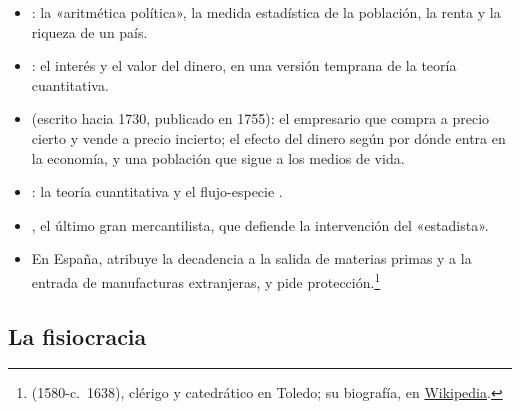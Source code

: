 \documentclass[11pt]{article}
\begin{document}
\begin{itemize}
\item {}: la «aritmética política», la medida estadística de la población, la renta y la riqueza de un país\nocite{Petty1690Political}.
\item {}: el interés y el valor del dinero, en una versión temprana de la teoría cuantitativa\nocite{Locke1692Some}.
\item {} (escrito hacia 1730, publicado en 1755): el empresario que compra a precio cierto y vende a precio incierto; el efecto del dinero según por dónde entra en la economía, y una población que sigue a los medios de vida\nocite{Cantillon1755Essai}.
\item {}: la teoría cuantitativa y el flujo-especie\nocite{Hume1752Money,Hume1752Balance} .
\item {}, el último gran mercantilista, que defiende la intervención del «estadista»\nocite{Steuart1767Inquiry}.
\item En España, \textcite{Moncada1619Restauracion} atribuye la decadencia a la salida de materias primas y a la entrada de manufacturas extranjeras, y pide protección.\footnote{ (1580-c.~1638), clérigo y catedrático en Toledo; su biografía, en \href{https://es.wikipedia.org/wiki/Sancho_de_Moncada}{Wikipedia}.}
\end{itemize}

\subsection{La fisiocracia}\label{anexo:fisiocracia}
\end{document}
